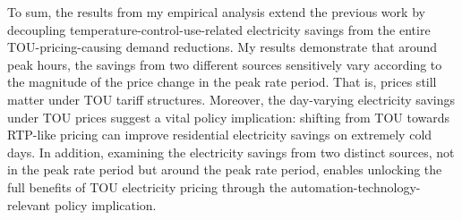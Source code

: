 To sum, the results from my empirical analysis extend the previous work by decoupling temperature-control-use-related electricity savings from the entire TOU-pricing-causing demand reductions. My results demonstrate that around peak hours, the savings from two different sources sensitively vary according to the magnitude of the price change in the peak rate period. That is, prices still matter under TOU tariff structures. Moreover, the day-varying electricity savings under TOU prices suggest a vital policy implication: shifting from TOU towards RTP-like pricing can improve residential electricity savings on extremely cold days. In addition, examining the electricity savings from two distinct sources, not in the peak rate period but around the peak rate period, enables unlocking the full benefits of TOU electricity pricing through the automation-technology-relevant policy implication. 
